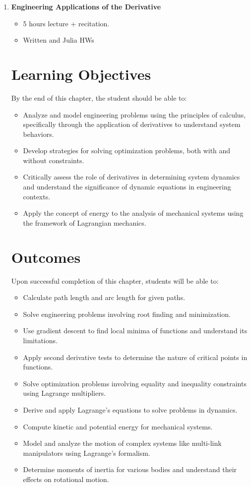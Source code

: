 \documentclass[letterpaper]{book}
\begin{document}
\begin{enumerate}[label={\large\arabic*}, font=\large]
\bigskip

\item {\Large \bf Engineering Applications of the Derivative}
\begin{itemize}
    \item 5 hours lecture + recitation.
    \item Written and Julia HWs
\end{itemize}

\section*{Learning Objectives}
By the end of this chapter, the student should be able to:
\begin{itemize}
    \item Analyze and model engineering problems using the principles of calculus, specifically through the application of derivatives to understand system behaviors.
    \item Develop strategies for solving optimization problems, both with and without constraints.
    \item Critically assess the role of derivatives in determining system dynamics and understand the significance of dynamic equations in engineering contexts.
    \item Apply the concept of energy to the analysis of mechanical systems using the framework of Lagrangian mechanics.
\end{itemize}



\section*{Outcomes}

Upon successful completion of this chapter, students will be able to:
\begin{itemize}
    \item Calculate path length and arc length for given paths.
    \item Solve engineering problems involving root finding and minimization.
    \item Use gradient descent to find local minima of functions and understand its limitations.
    \item Apply second derivative tests to determine the nature of critical points in functions.
    \item Solve optimization problems involving equality and inequality constraints using Lagrange multipliers.
    \item Derive and apply Lagrange’s equations to solve problems in dynamics.
    \item Compute kinetic and potential energy for mechanical systems.
    \item Model and analyze the motion of complex systems like multi-link manipulators using Lagrange’s formalism.
    \item Determine moments of inertia for various bodies and understand their effects on rotational motion.
\end{itemize}



\end{enumerate}
\end{document}
